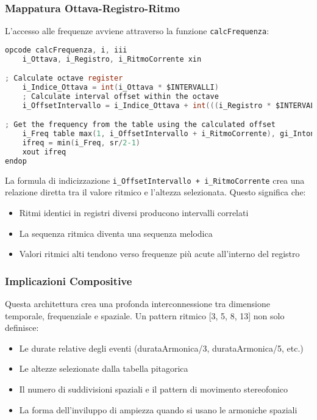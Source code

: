 \subsubsection{Mappatura Ottava-Registro-Ritmo}
L'accesso alle frequenze avviene attraverso la funzione \texttt{calcFrequenza}:

\begin{lstlisting}[language=C]
opcode calcFrequenza, i, iii
    i_Ottava, i_Registro, i_RitmoCorrente xin

; Calculate octave register
    i_Indice_Ottava = int(i_Ottava * $INTERVALLI)
    ; Calculate interval offset within the octave
    i_OffsetIntervallo = i_Indice_Ottava + int(((i_Registro * $INTERVALLI) / $REGISTRI))

; Get the frequency from the table using the calculated offset
    i_Freq table max(1, i_OffsetIntervallo + i_RitmoCorrente), gi_Intonazione
    ifreq = min(i_Freq, sr/2-1)
    xout ifreq
endop
\end{lstlisting}

La formula di indicizzazione \texttt{i\_OffsetIntervallo + i\_RitmoCorrente} crea una relazione diretta tra il valore ritmico e l'altezza selezionata. Questo significa che:

\begin{itemize}
    \item Ritmi identici in registri diversi producono intervalli correlati
    \item La sequenza ritmica diventa una sequenza melodica
    \item Valori ritmici alti tendono verso frequenze più acute all'interno del registro
\end{itemize}
\subsubsection{Implicazioni Compositive}
Questa architettura crea una profonda interconnessione tra dimensione temporale, frequenziale e spaziale. Un pattern ritmico [3, 5, 8, 13] non solo definisce:
\begin{itemize}
    \item Le durate relative degli eventi (durataArmonica/3, durataArmonica/5, etc.)
    \item Le altezze selezionate dalla tabella pitagorica
    \item Il numero di suddivisioni spaziali e il pattern di movimento stereofonico
    \item La forma dell'inviluppo di ampiezza quando si usano le armoniche spaziali
\end{itemize}

